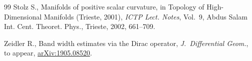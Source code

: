 \documentclass[11pt]{article}
\numberwithin{equation}{section}
\begin{document}
\begin{thebibliography}{99}
Stolz S., Manifolds of positive scalar curvature, in Topology of
 High-Dimensional Manifolds ({T}rieste, 2001), \textit{ICTP Lect. Notes},
 Vol.~9, Abdus Salam Int. Cent. Theoret. Phys., Trieste, 2002, 661--709.

Zeidler R., Band width estimates via the {D}irac operator,
 \textit{J.~Differential Geom.}, {t}o appear, \href{https://arxiv.org/abs/1905.08520}{arXiv:1905.08520}.

\end{thebibliography}
\end{document}

